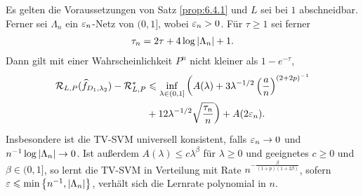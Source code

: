 \begin{prop}
\label{prop:6.4.4}
Es gelten die Voraussetzungen von Satz \ref{prop:6.4.1} und $L$ sei bei $1$
abschneidbar. Ferner sei $\Lambda_n$ ein $\varepsilon_n$-Netz von $(0,1]$, wobei
$\varepsilon_n>0$. Für $\tau \ge 1$ sei ferner
\begin{align*}
\tau_n=2\tau+4\log \left|\Lambda_n\right| + 1.
\end{align*}
Dann gilt mit einer Wahrscheinlichkeit $P^n$ nicht kleiner als $1-e^{-\tau}$,
\begin{align*}
\RR_{L,P}(\cut{f}_{D_1,\lambda_2}) - \RR_{L,P}^* &\le
\inf_{\lambda\in (0,1]} \bigg( A(\lambda) +
3\lambda^{-1/2}\left(\frac{a}{n}\right)^{(2+2p)^{-1}} 
\\ &
+12\lambda^{-1/2}\sqrt{\frac{\tau_n}{n}} \bigg) + A(2\ep_n).
\end{align*}
Insbesondere ist die TV-SVM universell konsistent, falls $\varepsilon_n\to 0$ und
$n^{-1}\log \left|\Lambda_n\right|\to 0$. Ist außerdem $A(\lambda)\le
c\lambda^\beta$ für $\lambda \ge 0$ und geeignetes $c\ge 0$ und $\beta\in(0,1]$,
so lernt die TV-SVM in Verteilung mit Rate $n^{-\frac{\beta}{(1+p)(1+2\beta)}}$,
sofern $\varepsilon \leqslant \min\left\{ n^{-1},\left|\Lambda_n\right| \right\}$, verhält sich die Lernrate
polynomial in $n$.\fishhere
\end{prop}

